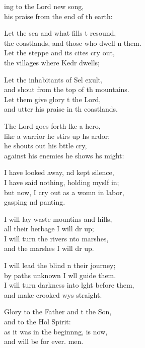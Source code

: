 \settowidth{\versewidth}{I will turn darkness into light before them, *}
\begin{psalmverse}%
  \begin{patverse}
ing to the Lord  new song,\Med\\
his praise from the end of th earth:

Let the sea and what fills \pointup{\i}t resound,\Med\\
the coastlands, and those who dwell \pointup{\i}n them.\\
Let the steppe and its cit\pointup{\i}es cry out,\Med\\
the villages where Kedr dwells;

Let the inhabitants of Sel exult,\Med\\
and shout from the top of th mountains.\\
Let them give glory t the Lord,\Med\\
and utter his praise in th coastlands.

The Lord goes forth l\pointup{\i}ke a hero,\Med\\
like a warrior he stirs up h\pointup{\i}s ardor;\\
he shouts out his bttle cry,\Med\\
against his enemies he shows h\pointup{\i}s might:

I have looked away, nd kept silence,\Med\\
I have said nothing, holding myslf in;\\
but now, I cry out as a womn in labor,\Med\\
gasping nd panting.

I will lay waste mountins and hills,\Med\\
all their herbage I will dr up;\\
I will turn the rivers \pointup{\i}nto marshes,\Med\\
and the marshes I will dr up.

I will lead the blind n their journey;\Med\\
by paths unknown I w\pointup{\i}ll guide them.\\
I will turn darkness into l\pointup{\i}ght before them,\Med\\
and make crooked wys straight.

Glory to the Father and t the Son,\Med\\
    and to the Hol Spirit:\\
as it was in the beginn\pointup{\i}ng, is now,\Med\\
    and will be for ever. men.
  \end{patverse}
\end{psalmverse}
